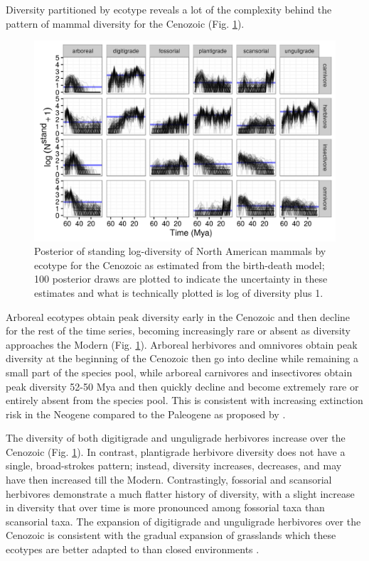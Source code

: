\documentclass[12pt,letterpaper]{article}
\begin{document}
Diversity partitioned by ecotype reveals a lot of the complexity behind the pattern of mammal diversity for the Cenozoic (Fig. \ref{fig:ecotype_diversity}). 

\begin{figure}[ht]
  \centering
  \includegraphics[width=\textwidth,height=0.4\textheight,keepaspectratio=true]{figure/ecotype_diversity}
  \caption[Estimated mammal ecotype log-diversity for the Cenozoic]{Posterior of standing log-diversity of North American mammals by ecotype for the Cenozoic as estimated from the birth-death model; 100 posterior draws are plotted to indicate the uncertainty in these estimates and what is technically plotted is log of diversity plus 1.}
  \label{fig:ecotype_diversity}
\end{figure}

Arboreal ecotypes obtain peak diversity early in the Cenozoic and then decline for the rest of the time series, becoming increasingly rare or absent as diversity approaches the Modern (Fig. \ref{fig:ecotype_diversity}). Arboreal herbivores and omnivores obtain peak diversity at the beginning of the Cenozoic then go into decline while remaining a small part of the species pool, while arboreal carnivores and insectivores obtain peak diversity 52-50 Mya and then quickly decline and become extremely rare or entirely absent from the species pool. This is consistent with increasing extinction risk in the Neogene compared to the Paleogene as proposed by \citet{Smits2015b}.

The diversity of both digitigrade and unguligrade herbivores increase over the Cenozoic (Fig. \ref{fig:ecotype_diversity}). In contrast, plantigrade herbivore diversity does not have a single, broad-strokes pattern; instead, diversity increases, decreases, and may have then increased till the Modern. Contrastingly, fossorial and scansorial herbivores demonstrate a much flatter history of diversity, with a slight increase in diversity that over time is more pronounced among fossorial taxa than scansorial taxa. The expansion of digitigrade and unguligrade herbivores over the Cenozoic is consistent with the gradual expansion of grasslands which these ecotypes are better adapted to than closed environments \citep{Blois2009,Stromberg2005}.
\end{document}
